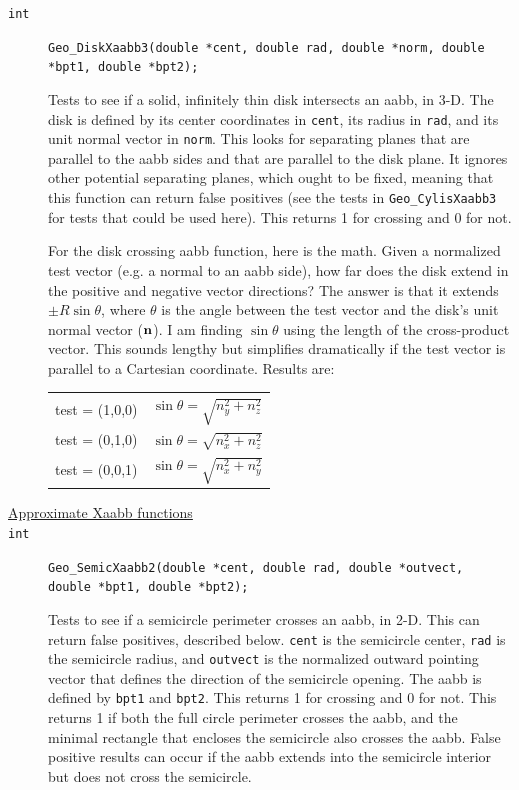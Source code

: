 \documentclass[11pt]{article}
\newcommand {\ttt} {\texttt}
\begin{document}
\begin{description}
\item[\ttt{int}]
\ttt{Geo\_DiskXaabb3(double *cent, double rad, double *norm, double *bpt1, double *bpt2);}

Tests to see if a solid, infinitely thin disk intersects an aabb, in 3-D. The disk is defined by its center coordinates in \ttt{cent}, its radius in \ttt{rad}, and its unit normal vector in \ttt{norm}. This looks for separating planes that are parallel to the aabb sides and that are parallel to the disk plane. It ignores other potential separating planes, which ought to be fixed, meaning that this function can return false positives (see the tests in \ttt{Geo\_CylisXaabb3} for tests that could be used here). This returns 1 for crossing and 0 for not.

For the disk crossing aabb function, here is the math. Given a normalized test vector (e.g. a normal to an aabb side), how far does the disk extend in the positive and negative vector directions? The answer is that it extends $\pm R \sin \theta$, where $\theta$ is the angle between the test vector and the disk's unit normal vector ($\vb{n}$). I am finding $\sin \theta$ using the length of the cross-product vector. This sounds lengthy but simplifies dramatically if the test vector is parallel to a Cartesian coordinate. Results are:

\begin{tabular}{cc}
test = (1,0,0) & $\sin \theta = \sqrt{n_y^2+n_z^2}$ \\
test = (0,1,0) & $\sin \theta = \sqrt{n_x^2+n_z^2}$ \\
test = (0,0,1) & $\sin \theta = \sqrt{n_x^2+n_y^2}$
\end{tabular}

\item[\underline{Approximate Xaabb functions}]

\item[\ttt{int}]
\ttt{Geo\_SemicXaabb2(double *cent, double rad, double *outvect, double *bpt1, double *bpt2);}

Tests to see if a semicircle perimeter crosses an aabb, in 2-D. This can return false positives, described below. \ttt{cent} is the semicircle center, \ttt{rad} is the semicircle radius, and \ttt{outvect} is the normalized outward pointing vector that defines the direction of the semicircle opening. The aabb is defined by \ttt{bpt1} and \ttt{bpt2}. This returns 1 for crossing and 0 for not. This returns 1 if both the full circle perimeter crosses the aabb, and the minimal rectangle that encloses the semicircle also crosses the aabb. False positive results can occur if the aabb extends into the semicircle interior but does not cross the semicircle.


\end{description}
\end{document}
